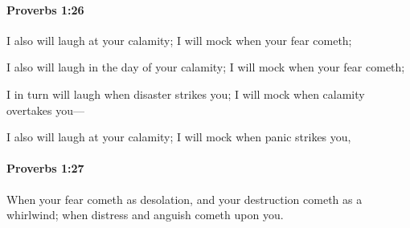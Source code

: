 		\paragraph{Proverbs 1:26} %
			\label{PROVERBS-1-26}

			I also will laugh at your calamity; I will mock when your fear cometh;

			\begin{versebox}
					\item[BHS] 
					\item[ASV] I also will laugh in the day of your calamity; I will mock when your fear cometh;
					\item[NIV] I in turn will laugh when disaster strikes you; I will mock when calamity overtakes you—
					\item[NRSV] I also will laugh at your calamity; I will mock when panic strikes you,
			\end{versebox}

		\paragraph{Proverbs 1:27} %
			\label{PROVERBS-1-27}

			When your fear cometh as desolation, and your destruction cometh as a whirlwind; when distress and anguish cometh upon you.


